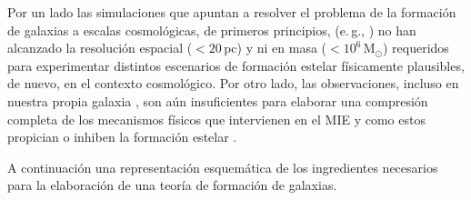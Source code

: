 \documentclass{article}
\begin{document}
Por un lado las simulaciones que apuntan a resolver el problema de la formación de galaxias a
escalas cosmológicas, de primeros principios, (e.\,g.,
\cites[\textsc{millenium}][]{Springel2005c}[\textsc{illustris}][]{Vogelsberger2014}) no han
alcanzado la resolución espacial ($<20\,$pc) y ni en masa ($<10^6\,$M$_\odot$) requeridos para
experimentar distintos escenarios de formación estelar físicamente plausibles, de nuevo, en el
contexto cosmológico. Por otro lado, las observaciones, incluso en nuestra propia galaxia
\citep[e.\,g.][]{Lada2010}, son aún insuficientes para elaborar una compresión completa de los
mecanismos físicos que intervienen en el MIE y como estos propician o inhiben la formación estelar
\citep[véase][para revisiones recientes]{McKee2007, Krumholz2014, Naab2016}.

A continuación una representación esquemática de los ingredientes necesarios para la elaboración de
una teoría de formación de galaxias.
%
%
\end{document}
